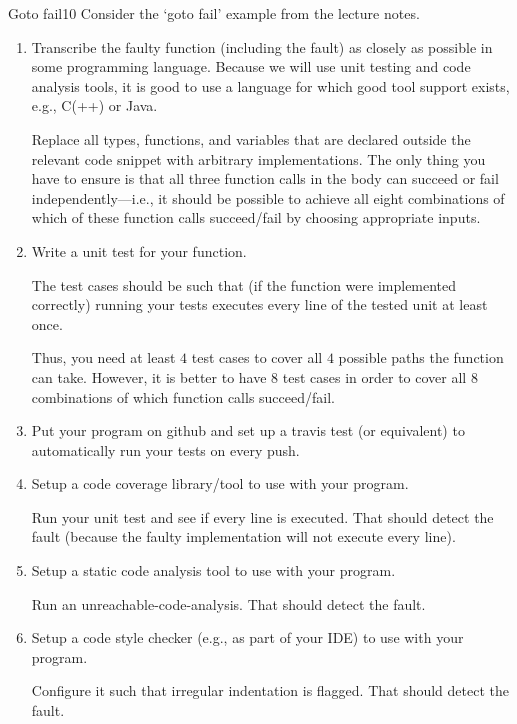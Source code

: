 \documentclass[a4paper]{article}
\begin{document}
\header

\begin{problem}{Goto fail}{10}
Consider the `goto fail' example from the lecture notes.

\begin{enumerate}
\item Transcribe the faulty function (including the fault) as closely as possible in some programming language.
Because we will use unit testing and code analysis tools, it is good to use a language for which good tool support exists, e.g., C(++) or Java.

Replace all types, functions, and variables that are declared outside the relevant code snippet with arbitrary implementations.
The only thing you have to ensure is that all three function calls in the body can succeed or fail independently---i.e., it should be possible to achieve all eight combinations of which of these function calls succeed/fail by choosing appropriate inputs.

\item Write a unit test for your function.

The test cases should be such that (if the function were implemented correctly) running your tests executes every line of the tested unit at least once.

Thus, you need at least $4$ test cases to cover all $4$ possible paths the function can take.
However, it is better to have $8$ test cases in order to cover all $8$ combinations of which function calls succeed/fail.

\item Put your program on github and set up a travis test (or equivalent) to automatically run your tests on every push.

\item Setup a code coverage library/tool to use with your program.

Run your unit test and see if every line is executed.
That should detect the fault (because the faulty implementation will not execute every line).

\item Setup a static code analysis tool to use with your program.

Run an unreachable-code-analysis.
That should detect the fault.

\item Setup a code style checker (e.g., as part of your IDE) to use with your program.

Configure it such that irregular indentation is flagged.
That should detect the fault.
\end{enumerate}


\end{problem}
\end{document}
